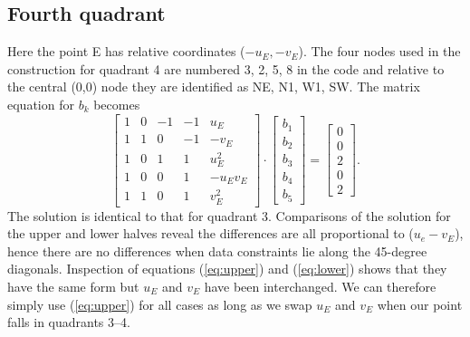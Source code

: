 \documentclass[12pt,letterpaper,margin=0.5in]{report}
\begin{document}
\subsection{Fourth quadrant}
Here the point E has relative coordinates ($-u_E, -v_E$).  The four nodes used in the
construction for quadrant 4 are numbered 3, 2, 5, 8 in the code and relative to the central (0,0) node they
are identified as NE, N1, W1, SW. The matrix equation for $b_k$ becomes
\begin{equation}
\left[ {\begin{array}{*{20}{r}}
1&0&{ - 1}&{ - 1}&{{u_E}}\\
1&1&0&{ - 1}&{ - {v_E}}\\
1&0&1&1&{u_E^2}\\
1&0&0&1&{ - {u_E}{v_E}}\\
1&1&0&1&{v_E^2}
\end{array}} \right] \cdot \left[ {\begin{array}{*{20}{c}}
{{b_1}}\\
{{b_2}}\\
{{b_3}}\\
{{b_4}}\\
{{b_5}}
\end{array}} \right] = \left[ {\begin{array}{*{20}{c}}
0\\
0\\
2\\
0\\
2
\end{array}} \right].
\end{equation}
The solution is identical to that for quadrant 3.
Comparisons of the solution for the upper and lower halves reveal the differences are all proportional to
($u_e - v_E$), hence there are no differences when data constraints lie along the 45-degree diagonals.
Inspection of equations (\ref{eq:upper}) and (\ref{eq:lower}) shows that they have the same form
but $u_E$ and $v_E$ have been interchanged.  We can therefore simply use (\ref{eq:upper}) for all cases
as long as we swap $u_E$ and $v_E$ when our point falls in quadrants 3--4.
\end{document}
